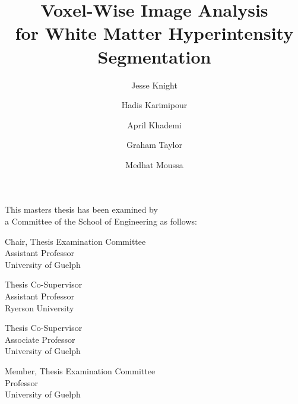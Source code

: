 \title{Voxel-Wise Image Analysis\\for White Matter Hyperintensity Segmentation}
\author{Jesse Knight}
\degreemonth{}
\copyrightnoticetext{}
\maketitle
\cleardoublepage{}
\setcounter{page}{1}
\begin{abstractpage}
  
\end{abstractpage}
\cleardoublepage{}
\begin{titlepage}
  \begin{large}
    This masters thesis has been examined by \\ a Committee of the School of Engineering as follows:
    \signature{Hadis Karimipour}{Chair, Thesis Examination Committee \\
      Assistant Professor\\
      University of Guelph}
    \signature{April Khademi}{Thesis Co-Supervisor \\
      Assistant Professor\\
      Ryerson University}
    \signature{Graham Taylor}{Thesis Co-Supervisor \\
      Associate Professor\\
      University of Guelph}
    \signature{Medhat Moussa}{Member, Thesis Examination Committee \\
      Professor\\
      University of Guelph}
  \end{large}
\end{titlepage}
